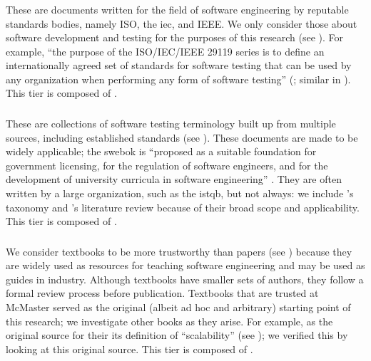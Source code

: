 \ifnotpaper\newpage\fi

\subsubsection{}
\label{stds}

These are documents written for the field of software engineering by reputable
standards bodies, namely ISO, the \acf{iec}, and IEEE. We only consider those
about software development and testing for the purposes of this research (see
). For example, ``the purpose of the ISO/IEC/IEEE 29119 series is
to define an internationally agreed set of standards for software testing that
can be used by any organization when performing any form of software testing''
\ifnotpaper(\fi\citealp[p.~vii]{IEEE2022}\ifnotpaper; similar in
\citeyear[p.~ix]{IEEE2016})\fi. This tier is composed of .

\subsubsection{}
\label{metas}

These are collections of software testing terminology built up from multiple
sources, including established standards (see ). These documents are
made to be widely applicable; the \acf{swebok} is ``proposed as a suitable
foundation for government licensing, for the regulation of software engineers,
and for the development of university curricula in software engineering''
\citep[p.~xix]{KanerEtAl2011}. They are often written by a large organization,
such as the \acf{istqb}, but not always: we include \citeauthor{Firesmith2015}'s
taxonomy \citeyearpar{Firesmith2015} and \citeauthor{DoğanEtAl2014}'s literature
review \citeyearpar{DoğanEtAl2014} because of their broad scope and
applicability.
This tier is composed of .

\subsubsection{}
\label{texts}

We consider textbooks to be more trustworthy than papers (see )
because they are widely used as resources for teaching software engineering and
may be used as guides in industry. Although textbooks have smaller sets of
authors, they follow a formal review process before publication. Textbooks that
are trusted at McMaster \citep{Patton2006, PetersAndPedrycz2000, vanVliet2000}
served as the original (albeit ad hoc and arbitrary) starting point of this
research; we investigate other books as they arise. For example, \citetISTQB{}
 \citep{GerrardAndThompson2002} as the original source
for \ifnotpaper their \else its \fi definition of ``scalability'' (see
); we verified this by
looking at this original source. This tier is composed of .

